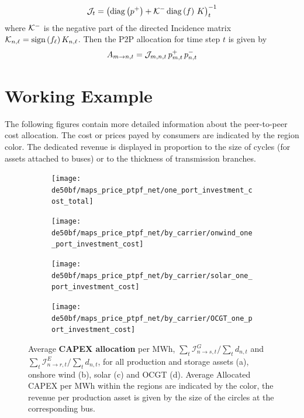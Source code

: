 \documentclass[11pt,twocolumn]{article}
\newcommand{\demand}[1][n]{d_{#1,t}}
\newcommand{\netconsumption}[1][n]{p^{-}_{#1,t}}
\newcommand{\netproduction}[1][n]{p^{+}_{#1,t}}
\newcommand{\incidence}[1][n]{K_{#1,\ell}}
\newcommand{\capexgeneration}{\mathcal{I}^G}
\newcommand{\capexstorage}{\mathcal{I}^E}
\newcommand{\allocatepeer}[1][m \rightarrow n]{A_{#1,t}}
\newcommand{\allocatecapexgeneration}[1][n \rightarrow s,t]{\capexgeneration_{#1}}
\newcommand{\allocatecapexstorage}[1][n \rightarrow r, t]{\capexstorage_{#1}}
\begin{document}
\begin{align}
\mathcal{J}_t = \left( \operatorname{diag}\left(p^+\right) + \mathcal{K}^- \operatorname{diag}\left(f\right) \, K \right)_t^{-1} 
\end{align}
where $\mathcal{K}^-$ is the negative part of the directed Incidence matrix $\DirectedIncidence_{n,\ell} = \text{sign}\left( f_\ell \right)  \incidence$. Then the P2P allocation for time step $t$ is given by
\begin{align}
\allocatepeer = \InverseAPInjection_{m,n,t} \, \netproduction[m] \, \netconsumption
\end{align}

\section{Working Example}
The following figures contain more detailed information about the peer-to-peer cost allocation. The cost or prices payed by consumers are indicated by the region color. The dedicated revenue is displayed in proportion to the size of cycles (for assets attached to buses) or to the thickness of transmission branches.    
\begin{figure}
    \centering
    \begin{subfigure}[c]{.49\linewidth}
        \texttt{[image: de50bf/maps\_price\_ptpf\_net/one\_port\_investment\_cost\_total]}
        \label{fig:total_capex}
    \end{subfigure}
    \begin{subfigure}[c]{.49\linewidth}
        \texttt{[image: de50bf/maps\_price\_ptpf\_net/by\_carrier/onwind\_one\_port\_investment\_cost]}
        \label{fig:onshore_capex}
    \end{subfigure}
    \begin{subfigure}[c]{.49\linewidth}
        \texttt{[image: de50bf/maps\_price\_ptpf\_net/by\_carrier/solar\_one\_port\_investment\_cost]}
        \label{fig:solar_capex}
    \end{subfigure}
    \begin{subfigure}[c]{.49\linewidth}
        \texttt{[image: de50bf/maps\_price\_ptpf\_net/by\_carrier/OCGT\_one\_port\_investment\_cost]}
        \label{fig:ocgt_capex}
    \end{subfigure}
    \caption{Average \textbf{CAPEX allocation} per MWh, $\sum_t \allocatecapexgeneration / \sum_t \demand$ and $\sum_t \allocatecapexstorage / \sum_t \demand$, for all production and storage assets (a), onshore wind (b), solar (c) and OCGT (d). Average Allocated CAPEX per MWh within the regions are indicated by the color, the revenue per production asset is given by the size of the circles at the corresponding bus.}
    \label{fig:capex_price}
\end{figure}
\end{document}
